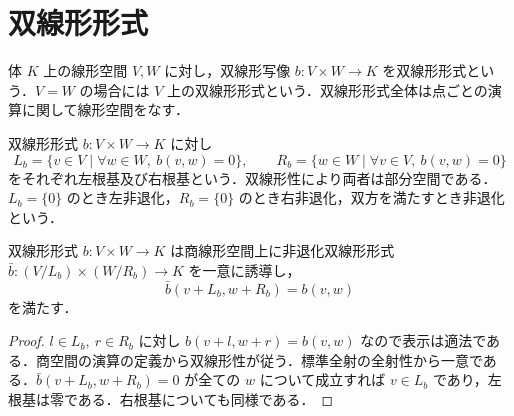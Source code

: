 \section{双線形形式}
\begin{defn}[双線形形式]
体 $K$ 上の線形空間 $V,W$ に対し，双線形写像 $b:V\times W\to K$ を双線形形式という．$V=W$ の場合には $V$ 上の双線形形式という．双線形形式全体は点ごとの演算に関して線形空間をなす．
\end{defn}
\begin{defn}[双線形形式の左根基と右根基]
双線形形式 $b:V\times W\to K$ に対し
\[
 L_b=\{v\in V\mid \forall w\in W,\ b(v,w)=0\},\qquad
 R_b=\{w\in W\mid \forall v\in V,\ b(v,w)=0\}
\]
をそれぞれ左根基及び右根基という．双線形性により両者は部分空間である．$L_b=\{0\}$ のとき左非退化，$R_b=\{0\}$ のとき右非退化，双方を満たすとき非退化という．
\end{defn}
\begin{prop}[根基による商空間上の非退化形式]
双線形形式 $b:V\times W\to K$ は商線形空間上に非退化双線形形式 $\bar b:(V/L_b)\times(W/R_b)\to K$ を一意に誘導し，
\[
 \bar b(v+L_b,w+R_b)=b(v,w)
\]
を満たす．
\end{prop}
\begin{proof}
$l\in L_b,\ r\in R_b$ に対し $b(v+l,w+r)=b(v,w)$ なので表示は適法である．商空間の演算の定義から双線形性が従う．標準全射の全射性から一意である．$\bar b(v+L_b,w+R_b)=0$ が全ての $w$ について成立すれば $v\in L_b$ であり，左根基は零である．右根基についても同様である．
\end{proof}
